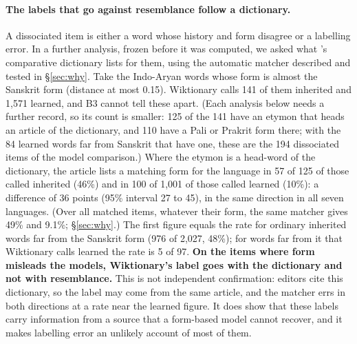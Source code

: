 \documentclass[11pt]{article}
\begin{document}
\paragraph{The labels that go against resemblance follow a dictionary.} A dissociated item is either a word whose history and form disagree or a labelling error. In a further analysis, frozen before it was computed, we asked what \citeauthor{turner1966cdial}'s comparative dictionary lists for them, using the automatic matcher described and tested in \S\ref{sec:why}. Take the Indo-Aryan words whose form is almost the Sanskrit form (distance at most 0.15). Wiktionary calls 141 of them inherited and 1,571 learned, and B3 cannot tell these apart. (Each analysis below needs a further record, so its count is smaller: 125 of the 141 have an etymon that heads an article of the dictionary, and 110 have a Pali or Prakrit form there; with the 84 learned words far from Sanskrit that have one, these are the 194 dissociated items of the model comparison.) Where the etymon is a head-word of the dictionary, the article lists a matching form for the language in 57 of 125 of those called inherited (46\%) and in 100 of 1,001 of those called learned (10\%): a difference of 36 points (95\% interval 27 to 45), in the same direction in all seven languages. (Over all matched items, whatever their form, the same matcher gives 49\% and 9.1\%; \S\ref{sec:why}.) The first figure equals the rate for ordinary inherited words far from the Sanskrit form (976 of 2,027, 48\%); for words far from it that Wiktionary calls learned the rate is 5 of 97. \textbf{On the items where form misleads the models, Wiktionary's label goes with the dictionary and not with resemblance.} This is not independent confirmation: editors cite this dictionary, so the label may come from the same article, and the matcher errs in both directions at a rate near the learned figure. It does show that these labels carry information from a source that a form-based model cannot recover, and it makes labelling error an unlikely account of most of them.
\end{document}
